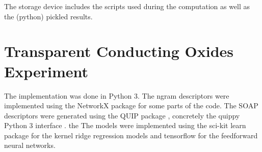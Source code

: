 \documentclass[11pt,oneside,czech,american]{book} %
\theoremstyle{definition} %
\theoremstyle{definition}
\begin{document}
The storage device includes the scripts used during the computation as well as the (python) pickled results.

\section{Transparent Conducting Oxides Experiment}
The implementation was done in Python 3. The ngram descriptors were implemented using the NetworkX package \parencite{networkx} for some parts of the code. The SOAP descriptors were generated using the QUIP package \parencite{csanyi07}, concretely the quippy Python 3 interface \parencite{kermode20}. the The models were implemented using the sci-kit learn package \parencite{sklearn_api} for the kernel ridge regression models and tensorflow \parencite{tensorflow15} for the feedforward neural networks.

\printbibliography
\end{document}
